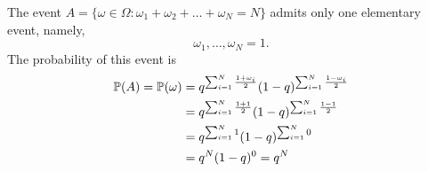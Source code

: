 The event $ A = \{ \omega \in \Omega: \omega_1 + \omega_2 + \dots + \omega_{N} = N \} $  admits only
one elementary event, namely,
\[
\omega_{1}, \dots, \omega_{N} = 1 
.\] 
The probability of this event is 
\begin{align*}
    \P(A) = \P(\omega) &= q^{ \sum_{i=1}^{N} \frac{1+ \omega_{i} }{2} } (1-q)^{ \sum_{i=1}^{N}
\frac{1-\omega_{i} }{2} } \\
		       &= q^{ \sum_{i=1}^{N} \frac{1+1}{2} } (1-q)^{ \sum_{i=1}^{N} \frac{1-1}{2} }
		       \\
		       &= q^{ \sum_{i=1}^{N} 1 } (1-q)^{ \sum_{i=1}^{N} 0 } \\
		       &= q^{N} (1-q)^{0} = q^{N} 
\end{align*}

